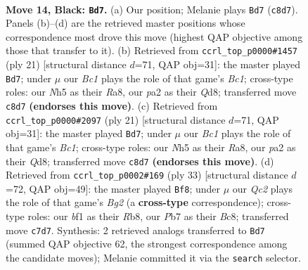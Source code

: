 \documentclass[11pt]{article}
\begin{document}
\begin{figure}[p]
\label{fig:thought-m25}
\end{figure}

\clearpage

\begin{figure}[p]\centering
\begin{subfigure}{0.46\textwidth}\centering
\resizebox{\linewidth}{!}{%
\newchessgame
\chessboard[
  setfen={rnbk3r/ppq1p1bp/3p2p1/4p1Pn/4P3/2N1B3/PPP2PQP/2KR1BR1 b - - 4 14},
  showmover=false,
  pgfstyle=straightmove, color=movearrow, markmove={c8-d7}
]}
\caption{}
\end{subfigure}\hfill
\begin{subfigure}{0.46\textwidth}\centering
\resizebox{\linewidth}{!}{%
\newchessgame
\chessboard[
  setfen={r1bq1rk1/1p2ppbp/3p1np1/p7/P2BP3/1BN5/1PP2PPP/R2Q1RK1 b - - 0 11},
  showmover=false,
  pgfstyle=straightmove, color=movearrow, markmove={c8-d7}
]}
\caption{}
\end{subfigure}
\\[4pt]
\begin{subfigure}{0.46\textwidth}\centering
\resizebox{\linewidth}{!}{%
\newchessgame
\chessboard[
  setfen={r1bq1rk1/1p2ppbp/3p1np1/p7/P2BP3/1BN5/1PP2PPP/R2Q1RK1 b - - 0 11},
  showmover=false,
  pgfstyle=straightmove, color=movearrow, markmove={c8-d7}
]}
\caption{}
\end{subfigure}\hfill
\begin{subfigure}{0.46\textwidth}\centering
\resizebox{\linewidth}{!}{%
\newchessgame
\chessboard[
  setfen={1rb1r1k1/2qn1pbp/p2pp1p1/2p5/2P1P3/2N1B2P/PPRQ1PP1/3R1BK1 b - - 5 17},
  showmover=false,
  pgfstyle=straightmove, color=movearrow, markmove={g7-f8}
]}
\caption{}
\end{subfigure}
\caption{\textbf{Move 14, Black: \texttt{Bd7}.} (a) Our position; Melanie plays \texttt{Bd7} (\texttt{c8d7}). Panels (b)--(d) are the retrieved master positions whose correspondence most drove this move (highest QAP objective among those that transfer to it). (b) Retrieved from \texttt{ccrl\_top\_p0000\#1457} (ply 21) [structural distance $d$=71, QAP obj=31]: the master played \texttt{Bd7}; under $\mu$ our \emph{Bc1} plays the role of that game's \emph{Bc1}; cross-type roles: our \emph{N}h5 as their \emph{R}a8, our \emph{p}a2 as their \emph{Q}d8; transferred move \texttt{c8d7} \textbf{(endorses this move)}. (c) Retrieved from \texttt{ccrl\_top\_p0000\#2097} (ply 21) [structural distance $d$=71, QAP obj=31]: the master played \texttt{Bd7}; under $\mu$ our \emph{Bc1} plays the role of that game's \emph{Bc1}; cross-type roles: our \emph{N}h5 as their \emph{R}a8, our \emph{p}a2 as their \emph{Q}d8; transferred move \texttt{c8d7} \textbf{(endorses this move)}. (d) Retrieved from \texttt{ccrl\_top\_p0002\#169} (ply 33) [structural distance $d$=72, QAP obj=49]: the master played \texttt{Bf8}; under $\mu$ our \emph{Qc2} plays the role of that game's \emph{Bg2} (a \textbf{cross-type} correspondence); cross-type roles: our \emph{b}f1 as their \emph{R}b8, our \emph{P}b7 as their \emph{B}c8; transferred move \texttt{c7d7}. Synthesis: 2 retrieved analogs transferred to \texttt{Bd7} (summed QAP objective 62, the strongest correspondence among the candidate moves); Melanie committed it via the \texttt{search} selector.}

\end{figure}
\end{document}
